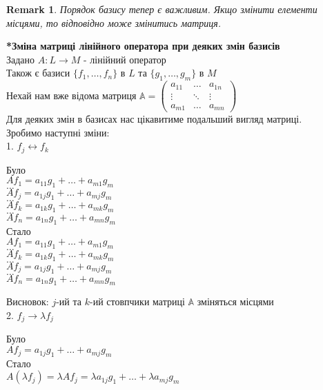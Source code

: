 \documentclass[a4paper, 10pt]{article}
\theoremstyle{theoremdd}
\theoremstyle{theoremdd}
\theoremstyle{theoremdd}
\theoremstyle{theoremdd}
\theoremstyle{theoremdd}
\theoremstyle{theoremdd}
\newtheorem{remark}[theorem]{Remark}
\theoremstyle{theoremdd}
\theoremstyle{theoremdd}
\begin{document}
	\begin{remark}
	Порядок базису тепер є важливим. Якщо змінити елементи місцями, то відповідно може змінитись матриця.
	\end{remark}
	\iffalse
	\textbf{*Зміна матриці лінійного оператора при деяких змін базисів}\\
	Задано $A: L \to M$ - лінійний оператор \\ Також є базиси $\{f_1,\dots,f_n\}$ в $L$ та $\{g_1,\dots,g_m\}$ в $M$\\
	Нехай нам вже відома матриця $\mathbb{A} = \begin{pmatrix}
	a_{11} & \dots & a_{1n} \\
	\vdots & \ddots & \vdots \\
	a_{m1} & \dots & a_{mn}
	\end{pmatrix}$\\
	Для деяких змін в базисах нас цікавитиме подальший вигляд матриці.\\
	Зробимо наступні зміни:
	\bigskip \\
	1. $f_j \longleftrightarrow f_k$
\multicolsep=0pt
	\begin{multicols}{2}
	Було \\
$Af_1 = a_{11}g_1 + \dots + a_{m1}g_m$ \\
$\dots$ \\
$Af_j = a_{1j}g_1 + \dots + a_{mj}g_m$ \\
$\dots$ \\
$Af_k = a_{1k}g_1 + \dots + a_{mk}g_m$ \\
$\dots$ \\
$Af_n = a_{1n}g_1 + \dots + a_{mn}g_m$
	\columnbreak
	\\
	Стало \\
$Af_1 = a_{11}g_1 + \dots + a_{m1}g_m$ \\
$\dots$ \\
$Af_k = a_{1k}g_1 + \dots + a_{mk}g_m$\\
$\dots$ \\
$Af_j = a_{1j}g_1 + \dots + a_{mj}g_m$\\
$\dots$ \\
$Af_n = a_{1n}g_1 + \dots + a_{mn}g_m$
	\end{multicols}
	Висновок: $j$-ий та $k$-ий стовпчики матриці $\mathbb{A}$ зміняться місцями
	\bigskip \\
	2. $f_j \rightarrow \lambda f_j$
\multicolsep=0pt
	\begin{multicols}{2}
	Було \\
$Af_j = a_{1j}g_1 + \dots + a_{mj}g_m$
	\columnbreak
	\\
	Стало \\
$A(\lambda f_j) = \lambda Af_j = \lambda a_{1j}g_1 + \dots + \lambda a_{mj}g_m$
	\end{multicols}
\end{document}
